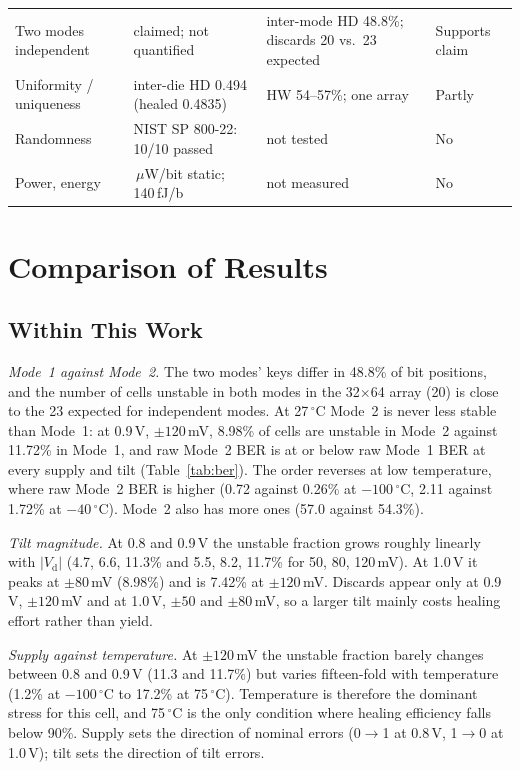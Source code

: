\documentclass[journal]{IEEEtran}
\newcommand{\Vd}{V_{\mathrm{d}}}
\begin{document}
\begin{table}[!t]
\begin{tabular}{@{}>{\raggedright\arraybackslash}p{}>{\raggedright\arraybackslash}p{}>{\raggedright\arraybackslash}p{}>{\raggedright\arraybackslash}p{}@{}}
Two modes independent & claimed; not quantified & inter-mode HD 48.8\%; discards 20 vs.\ 23 expected & Supports claim \\
Uniformity / uniqueness & inter-die HD 0.494 (healed 0.4835) & HW 54--57\%; one array & Partly \\
Randomness & NIST SP 800-22: 10/10 passed & not tested & No \\
Power, energy & 0.20\,$\mu$W/bit static; 140\,fJ/b & not measured & No \\
\bottomrule
\end{tabular}
\end{table}

\section{Comparison of Results}
\label{sec:compare}
\subsection{Within This Work}
\emph{Mode~1 against Mode~2.} The two modes' keys differ in 48.8\% of bit positions, and the number of cells unstable in both modes in the 32$\times$64 array (20) is close to the 23 expected for independent modes. At 27\,$^\circ$C Mode~2 is never less stable than Mode~1: at 0.9\,V, $\pm120$\,mV, 8.98\% of cells are unstable in Mode~2 against 11.72\% in Mode~1, and raw Mode~2 BER is at or below raw Mode~1 BER at every supply and tilt (Table~\ref{tab:ber}). The order reverses at low temperature, where raw Mode~2 BER is higher (0.72 against 0.26\% at $-100\,^\circ$C, 2.11 against 1.72\% at $-40\,^\circ$C). Mode~2 also has more ones (57.0 against 54.3\%).

\emph{Tilt magnitude.} At 0.8 and 0.9\,V the unstable fraction grows roughly linearly with $|\Vd|$ (4.7, 6.6, 11.3\% and 5.5, 8.2, 11.7\% for 50, 80, 120\,mV). At 1.0\,V it peaks at $\pm80$\,mV (8.98\%) and is 7.42\% at $\pm120$\,mV. Discards appear only at 0.9\,V, $\pm120$\,mV and at 1.0\,V, $\pm50$ and $\pm80$\,mV, so a larger tilt mainly costs healing effort rather than yield.

\emph{Supply against temperature.} At $\pm120$\,mV the unstable fraction barely changes between 0.8 and 0.9\,V (11.3 and 11.7\%) but varies fifteen-fold with temperature (1.2\% at $-100\,^\circ$C to 17.2\% at 75\,$^\circ$C). Temperature is therefore the dominant stress for this cell, and 75\,$^\circ$C is the only condition where healing efficiency falls below 90\%. Supply sets the direction of nominal errors (0$\rightarrow$1 at 0.8\,V, 1$\rightarrow$0 at 1.0\,V); tilt sets the direction of tilt errors.
\end{document}
